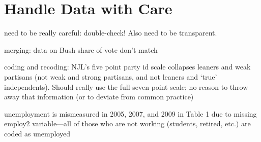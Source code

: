 

\section{Handle Data with Care}

need to be really careful: double-check!  Also need to be transparent.

merging: data on Bush share of vote don't match

coding and recoding: NJL's five point party id scale collapses leaners and weak partisans (not weak and strong partisans, and not leaners and `true' independents).  Should really use the full seven point scale; no reason to throw away that information (or to deviate from common practice)

unemployment is mismeasured in 2005, 2007, and 2009 in Table 1 due to missing employ2 variable---all of those who are not working (students, retired, etc.) are coded as unemployed

